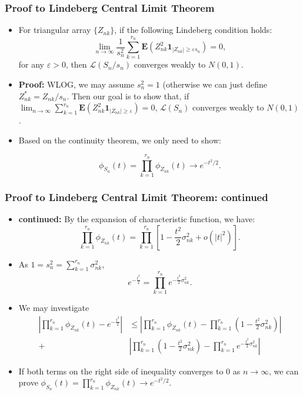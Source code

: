 \documentclass[handout]{beamer}
\newcommand{\BE}{\mathbf{E}}
\newcommand{\BI}{\mathbf{1}}
\begin{document}
     \frame
{
  \frametitle{Proof to Lindeberg Central Limit Theorem}
   \begin{itemize}

\item<1->[] \begin{Theorem} For triangular array $\{Z_{nk}\}$, if the following Lindeberg condition holds:
$$\lim_{n\rightarrow \infty} \frac{1}{s_n^2} \sum_{k=1}^{r_n} \BE(Z_{nk}^2 \BI_{|Z_{nk}|\geq \varepsilon s_n})=0,$$
for any $\varepsilon>0$, then $\mathcal{L} (S_n/s_n)$ converges weakly to $N(0,1)$.
\end{Theorem}


\item<2-> \textbf{Proof:} WLOG, we may assume $s_n^2=1$ (otherwise we can just define $Z_{nk}^*=Z_{nk}/s_n.$ Then our goal is to show that, if $\lim_{n\rightarrow \infty} \sum_{k=1}^{r_n} \BE(Z_{nk}^2 \BI_{|Z_{nk}|\geq \varepsilon })=0$, $\mathcal{L} (S_n)$ converges weakly to $N(0,1)$.

\item<3->[-] Based on the continuity theorem, we only need to show:

$$\phi_{S_n} (t)=\prod_{k=1}^{r_n} \phi_{Z_{nk}}(t) \rightarrow e^{-t^2/2}.$$

\end{itemize}
}

 
      \frame
{
  \frametitle{Proof to Lindeberg Central Limit Theorem: continued}
   \begin{itemize}

\item<1->\textbf{continued:} By the expansion of characteristic function, we have:
$$\prod_{k=1}^{r_n} \phi_{Z_{nk}}(t)=\prod_{k=1}^{r_n} [1-\frac{t^2}{2} \sigma^2_{nk}+ o(|t|^2) ].$$

\item<2->[-] As $1=s_n^2=\sum_{k=1}^{r_n}\sigma_{nk}^2$, 
$$ e^{-\frac{t^2}{2}}=\prod_{k=1}^{r_n} e^{-\frac{t^2}{2}\sigma^2_{nk}}.$$

\item<3->[-] We may investigate
\begin{align*}  |\prod_{k=1}^{r_n} \phi_{Z_{nk}}(t)-e^{-\frac{t^2}{2}}|  & \leq |\prod_{k=1}^{r_n} \phi_{Z_{nk}}(t)-\prod_{k=1}^{r_n} (1-\frac{t^2}{2} \sigma^2_{nk})|\\ + &  |\prod_{k=1}^{r_n} (1-\frac{t^2}{2} \sigma^2_{nk})-\prod_{k=1}^{r_n} e^{-\frac{t^2}{2}\sigma^2_{nk}}|\end{align*}

\item<4->[-] If both terms on the right side of inequality converges to 0 as $n\rightarrow \infty$, we can prove $\phi_{S_n} (t)=\prod_{k=1}^{r_n} \phi_{Z_{nk}}(t) \rightarrow e^{-t^2/2}.$

\end{itemize}
}
\end{document}
